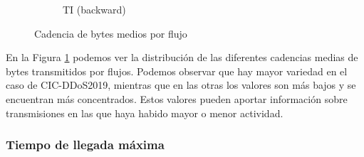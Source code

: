 \begin{figure}[H]
\begin{subfigure}[b]{0.26\textwidth}
        \caption{TI (backward)}
    \end{subfigure}
    \hfill
       \caption{Cadencia de bytes medios por flujo}
       \label{fig:packet_pincer_bytes_s}
\end{figure}

En la Figura \ref{fig:packet_pincer_bytes_s} podemos ver la distribución de las diferentes cadencias medias de bytes transmitidos por flujos. Podemos observar que hay mayor variedad en el caso de CIC-DDoS2019, mientras que en las otras los valores son más bajos y se encuentran más concentrados. Estos valores pueden aportar información sobre transmisiones en las que haya habido mayor o menor actividad.

\subsubsection{Tiempo de llegada máxima}


